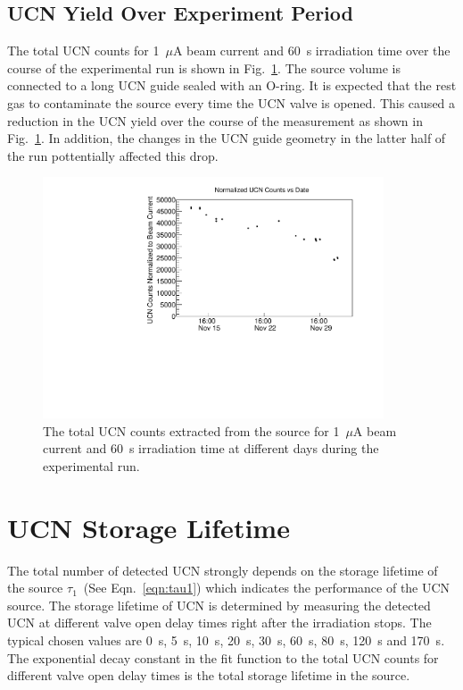 \subsection{UCN Yield Over Experiment Period}

The total UCN counts for 1~$\mu$A beam current and 60~s irradiation
time over the course of the experimental run is shown in
Fig.~\ref{fig:UCNCounts_time}. 
The source volume is connected to a long UCN guide sealed with an
O-ring. It is expected that the rest gas to contaminate the source
every time the UCN valve is opened. This caused a reduction in the UCN
yield over the course of the measurement as shown in
Fig.~\ref{fig:UCNCounts_time}. In addition, the changes in the UCN
guide geometry in the latter half of the run pottentially affected
this drop.


\begin{figure}[h]
  \centering
  \includegraphics[width=0.9\textwidth]{UCNCounts_vs_time.pdf}
  \caption{The total UCN counts extracted from the source for 1~$\mu$A
    beam current and 60~s irradiation time at different days during
    the experimental run. }
  \label{fig:UCNCounts_time}
\end{figure}

\section{UCN Storage Lifetime~\label{storagelifetime}}

The total number of detected UCN strongly depends on the storage
lifetime of the source $\tau_1$~(See Eqn.~\ref{eqn:tau1}) which
indicates the performance of the UCN source. The storage lifetime of
UCN is determined by measuring the detected UCN at different valve
open delay times right after the irradiation stops. The typical chosen
values are 0~s, 5~s, 10~s, 20~s, 30~s, 60~s, 80~s, 120~s and
170~s. The exponential decay constant in the fit function to the total
UCN counts for different valve open delay times is the total storage
lifetime in the source.

